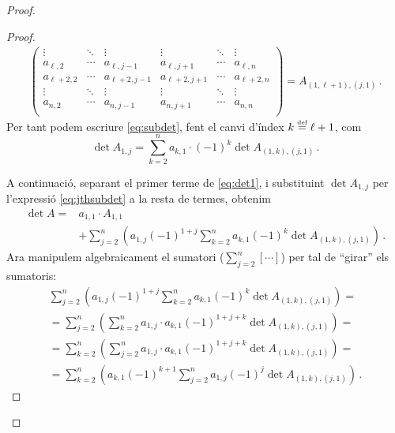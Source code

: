 \begin{teo}
\begin{proof}
\begin{lema}
\begin{adjustwidth}{0.8cm}{}
\begin{proof}
\begin{equation*}
\begin{split}
\begin{pmatrix}
				\vdots&	\ddots&	   \vdots&	\vdots&	\ddots&	\vdots\\
				a_{\ell,2}&\cdots&a_{\ell,j-1}&a_{\ell,j+1}&\cdots& a_{\ell,n}\\
				a_{\ell+2,2}&\cdots&a_{\ell+2,j-1}&a_{\ell+2,j+1}&\cdots&	a_{\ell+2,n}\\
				\vdots&	\ddots&	\vdots&	\vdots&	\ddots&		\vdots\\
				a_{n,2}&   \cdots&	a_{n,j-1}&	a_{n,j+1}&\cdots&a_{n,n}\\
			\end{pmatrix} = A_{(1,\ell+1),(j,1)}
			\,.
			\end{split}
		\end{equation*}
		Per tant podem escriure \eqref{eq:subdet}, fent el canvi d'índex $k\stackrel{\text{\tiny def}}{=} \ell+1$, com 
		\begin{equation}\label{eq:jthsubdet}
			\det A_{1,j} = \sum_{k=2}^{n} a_{k,1}\cdot(-1)^{k}\det A_{(1,k),(j,1)}\,.
		\end{equation}
		
		A continuació, separant el primer terme de \eqref{eq:det1}, i substituint $\det A_{1,j}$ per l'expressió \eqref{eq:jthsubdet} a la resta de termes, obtenim
		\begin{equation}\label{eq:parrafada}
		\begin{split}
			\det A ={}& a_{1,1}\cdot A_{1,1} \\
			&+\sum_{j=2}^{n} \left(a_{1,j} (-1)^{1+j}  \sum_{k=2}^{n} a_{k,1} (-1)^{k} \det A_{(1,k),(j,1)}\right)\,.
		\end{split}
		\end{equation}
		Ara manipulem algebraicament el sumatori  ($\sum_{j=2}^n [\cdots]$) per tal de ``girar'' els sumatoris:
		\begin{multline}\label{eq:sumofjth}
			\sum_{j=2}^{n} \left(a_{1,j} (-1)^{1+j}  \sum_{k=2}^{n} a_{k,1} (-1)^{k} \det A_{(1,k),(j,1)}\right)=\\
			=\sum_{j=2}^{n} \left(  \sum_{k=2}^{n} a_{1,j}\cdot a_{k,1} (-1)^{1+j+k} \det A_{(1,k),(j,1)}\right)=\\
			=\sum_{k=2}^{n} \left(  \sum_{j=2}^{n} a_{1,j}\cdot a_{k,1} (-1)^{1+j+k} \det A_{(1,k),(j,1)}\right)=\\
			=\sum_{k=2}^{n} \left(a_{k,1} (-1)^{k+1}  \sum_{j=2}^{n} a_{1,j} (-1)^{j} \det A_{(1,k),(j,1)}\right)\,.
		\end{multline}


\end{proof}
\end{adjustwidth}
\end{lema}
\end{proof}
\end{teo}
